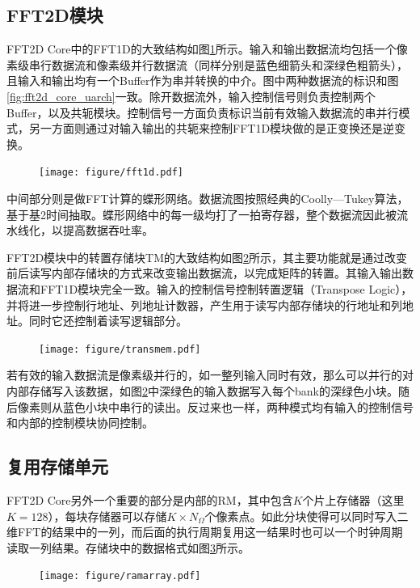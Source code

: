 \documentclass[master]{shtthesis}             %
\begin{document}
\subsection{FFT2D模块}
FFT2D Core中的FFT1D的大致结构如图\ref{fig:fft_arch}所示。输入和输出数据流均包括一个像素级串行数据流和像素级并行数据流（同样分别是蓝色细箭头和深绿色粗箭头），且输入和输出均有一个Buffer作为串并转换的中介。图中两种数据流的标识和图\ref{fig:fft2d_core_uarch}一致。除开数据流外，输入控制信号则负责控制两个Buffer，以及共轭模块。控制信号一方面负责标识当前有效输入数据流的串并行模式，另一方面则通过对输入输出的共轭来控制FFT1D模块做的是正变换还是逆变换。
\begin{figure}[!tb]
    \centering
    \texttt{[image: figure/fft1d.pdf]}
    \label{fig:fft_arch}
\end{figure}
中间部分则是做FFT计算的蝶形网络。数据流图按照经典的Coolly—Tukey算法，基于基2时间抽取。蝶形网络中的每一级均打了一拍寄存器，整个数据流因此被流水线化，以提高数据吞吐率。

FFT2D模块中的转置存储块TM的大致结构如图\ref{fig:transmem}所示，其主要功能就是通过改变前后读写内部存储块的方式来改变输出数据流，以完成矩阵的转置。其输入输出数据流和FFT1D模块完全一致。输入的控制信号控制转置逻辑（Transpose Logic），并将进一步控制行地址、列地址计数器，产生用于读写内部存储块的行地址和列地址。同时它还控制着读写逻辑部分。
\begin{figure}[!tb]
  \centering
  \texttt{[image: figure/transmem.pdf]}
  \label{fig:transmem}
\end{figure}
若有效的输入数据流是像素级并行的，如一整列输入同时有效，那么可以并行的对内部存储写入该数据，如图\ref{fig:transmem}中深绿色的输入数据写入每个bank的深绿色小块。随后像素则从蓝色小块中串行的读出。反过来也一样，两种模式均有输入的控制信号和内部的控制模块协同控制。

\subsection{复用存储单元}

FFT2D Core另外一个重要的部分是内部的RM，其中包含$K$个片上存储器（这里$K=128$），每块存储器可以存储$K\times N_\Omega$个像素点。如此分块使得可以同时写入二维FFT的结果中的一列，而后面的执行周期复用这一结果时也可以一个时钟周期读取一列结果。存储块中的数据格式如图\ref{fig:ram_array}所示。
\begin{figure}[!tb]
    \centering
    \texttt{[image: figure/ramarray.pdf]}
    \label{fig:ram_array}
\end{figure}
\end{document}
